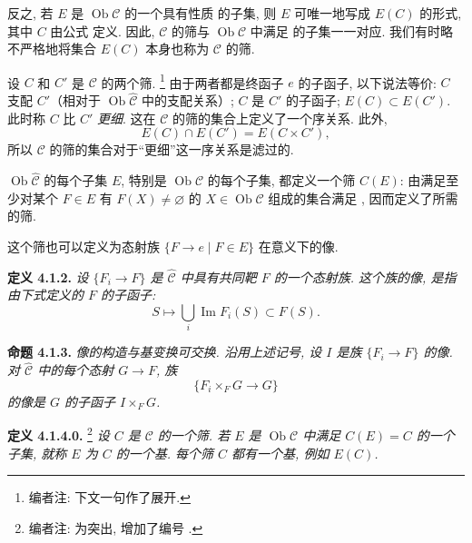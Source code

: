 反之, 若 \(E\) 是 \(\operatorname{Ob}\mathscr C\) 的一个具有性质
 的子集,
则 \(E\) 可唯一地写成 \(E(C)\) 的形式, 其中 \(C\)
由公式  定义.
因此, \(\mathscr C\) 的筛与 \(\operatorname{Ob}\mathscr C\)
中满足  的子集一一对应.
我们有时略不严格地将集合 \(E(C)\) 本身也称为 \(\mathscr C\) 的筛.

设 \(C\) 和 \(C'\) 是 \(\mathscr C\) 的两个筛.
\footnote{编者注: 下文一句作了展开.}
由于两者都是终函子 \(e\) 的子函子, 以下说法等价:
\(C\) 支配 \(C'\)（相对于 \(\operatorname{Ob}\widehat{\mathscr C}\)
中的支配关系）; \(C\) 是 \(C'\) 的子函子;
\(E(C)\subset E(C')\). 此时称 \(C\) 比 \(C'\) \emph{更细}.
这在 \(\mathscr C\) 的筛的集合上定义了一个序关系. 此外,
\[
 E(C)\cap E(C')=E(C\times C'),
\]
所以 \(\mathscr C\) 的筛的集合对于“更细”这一序关系是滤过的.

\(\operatorname{Ob}\widehat{\mathscr C}\) 的每个子集 \(E\),
特别是 \(\operatorname{Ob}\mathscr C\) 的每个子集, 都定义一个筛 \(C(E)\):
由满足至少对某个 \(F\in E\) 有 \(F(X)\ne\varnothing\) 的
\(X\in\operatorname{Ob}\mathscr C\) 组成的集合满足
,
因而定义了所需的筛.

这个筛也可以定义为态射族 \(\{F\to e\mid F\in E\}\)
在意义下的像.

\medskip
\noindent{}\textbf{定义 4.1.2.}
\textit{设 \(\{F_i\to F\}\) 是 \(\widehat{\mathscr C}\)
中具有共同靶 \(F\) 的一个态射族. 这个族的\emph{像},
是指由下式定义的 \(F\) 的子函子:}
\[
 S\longmapsto\bigcup_i\operatorname{Im}F_i(S)\subset F(S).
\]

\medskip
\noindent{}\textbf{命题 4.1.3.}
\textit{像的构造与基变换可交换. 沿用上述记号,
设 \(I\) 是族 \(\{F_i\to F\}\) 的像.
对 \(\widehat{\mathscr C}\) 中的每个态射 \(G\to F\), 族}
\[
 \{F_i\times_FG\longrightarrow G\}
\]
\textit{的像是 \(G\) 的子函子 \(I\times_FG\).}

\medskip
\noindent{}\textbf{定义 4.1.4.0.}
\footnote{编者注: 为突出,
增加了编号 .}
\textit{设 \(C\) 是 \(\mathscr C\) 的一个筛.
若 \(E\) 是 \(\operatorname{Ob}\mathscr C\) 中满足 \(C(E)=C\) 的一个子集,
就称 \(E\) 为 \(C\) 的一个\emph{基}.
每个筛 \(C\) 都有一个基, 例如 \(E(C)\).}

